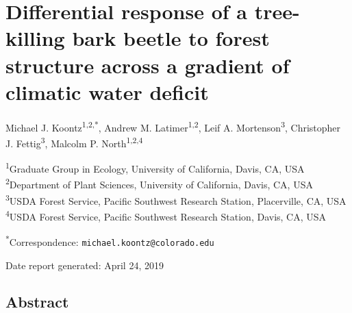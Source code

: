 \documentclass[]{article}
\title{}
\author{}
\date{}
\begin{document}
\section{Differential response of a tree-killing bark beetle to forest
structure across a gradient of climatic water
deficit}\label{differential-response-of-a-tree-killing-bark-beetle-to-forest-structure-across-a-gradient-of-climatic-water-deficit}

Michael J. Koontz\textsuperscript{1,2,*}, Andrew M.
Latimer\textsuperscript{1,2}, Leif A. Mortenson\textsuperscript{3},
Christopher J. Fettig\textsuperscript{3}, Malcolm P.
North\textsuperscript{1,2,4}

\textsuperscript{1}Graduate Group in Ecology, University of California,
Davis, CA, USA\\
\textsuperscript{2}Department of Plant Sciences, University of
California, Davis, CA, USA\\
\textsuperscript{3}USDA Forest Service, Pacific Southwest Research
Station, Placerville, CA, USA\\
\textsuperscript{4}USDA Forest Service, Pacific Southwest Research
Station, Davis, CA, USA

\textsuperscript{*}Correspondence: \texttt{michael.koontz@colorado.edu}

Date report generated: April 24, 2019

\subsection{Abstract}\label{abstract}
\end{document}
